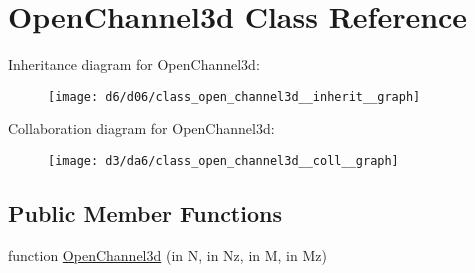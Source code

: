 \hypertarget{class_open_channel3d}{}\section{Open\+Channel3d Class Reference}
\label{class_open_channel3d}


Inheritance diagram for Open\+Channel3d\+:
\nopagebreak
\begin{figure}[H]
\begin{center}
\leavevmode
\texttt{[image: d6/d06/class\_open\_channel3d\_\_inherit\_\_graph]}
\end{center}
\end{figure}


Collaboration diagram for Open\+Channel3d\+:
\nopagebreak
\begin{figure}[H]
\begin{center}
\leavevmode
\texttt{[image: d3/da6/class\_open\_channel3d\_\_coll\_\_graph]}
\end{center}
\end{figure}
\subsection*{Public Member Functions}
\begin{DoxyCompactItemize}
\item 
function \hyperlink{class_open_channel3d_a3f2efb9bdd9eb8c5db131b809b6ee69f}{Open\+Channel3d} (in N, in Nz, in M, in Mz)
\end{DoxyCompactItemize}
